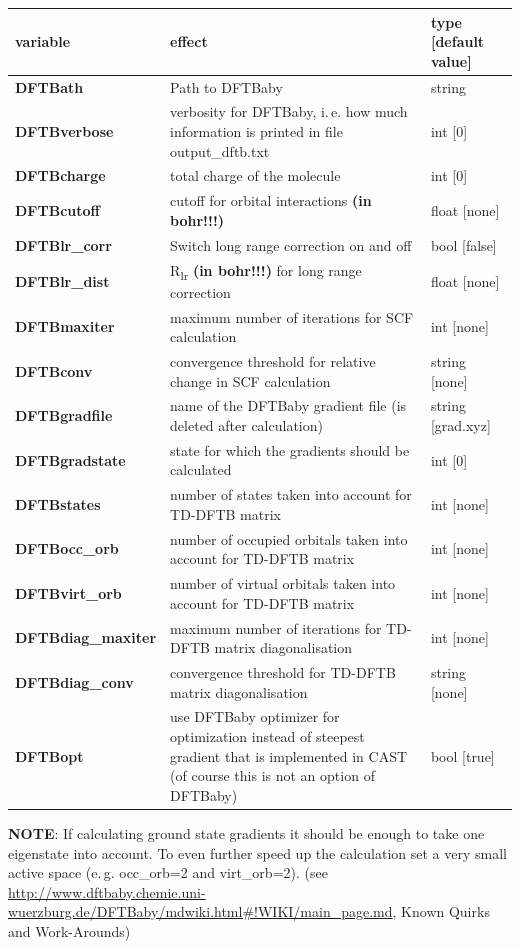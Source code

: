 \documentclass[10pt,a4paper]{article} %
\begin{document}
\begin{longtable}{|p{3.5cm}|p{5cm}|p{3cm}|}
	variable & effect & type [default value] \\
	\hline
	\textbf{DFTBath} & Path to DFTBaby & string \\
	\textbf{DFTBverbose} & verbosity for DFTBaby, i.\,e. how much information is printed in file output\_dftb.txt & int [0] \\	
	\textbf{DFTBcharge} & total charge of the molecule & int [0] \\
	\textbf{DFTBcutoff} & cutoff for orbital interactions \textbf{(in bohr!!!)} & float [none] \\
	\textbf{DFTBlr\_corr} & Switch long range correction on and off & bool [false] \\
	\textbf{DFTBlr\_dist} & R\textsubscript{lr} \textbf{(in bohr!!!)} for long range correction & float [none] \\
	\textbf{DFTBmaxiter} & maximum number of iterations for SCF calculation & int [none] \\
	\textbf{DFTBconv} & convergence threshold for relative change in SCF calculation & string [none] \\
	\textbf{DFTBgradfile} & name of the DFTBaby gradient file (is deleted after calculation) & string [grad.xyz] \\
	\textbf{DFTBgradstate} & state for which the gradients should be calculated & int [0] \\
	\textbf{DFTBstates} & number of states taken into account for TD-DFTB matrix & int [none] \\
	\textbf{DFTBocc\_orb} & number of occupied orbitals taken into account for TD-DFTB matrix & int [none] \\
	\textbf{DFTBvirt\_orb} & number of virtual orbitals taken into account for TD-DFTB matrix & int [none] \\
	\textbf{DFTBdiag\_maxiter} & maximum number of iterations for TD-DFTB matrix diagonalisation & int [none] \\
	\textbf{DFTBdiag\_conv} & convergence threshold for TD-DFTB matrix diagonalisation & string [none] \\
	\textbf{DFTBopt} & use DFTBaby optimizer for optimization instead of steepest gradient that is implemented in CAST (of course this is not an option of DFTBaby) & bool [true] \\
\end{longtable} 

\textbf{NOTE}: If calculating ground state gradients it should be enough to take one eigenstate into account. To even further speed up the calculation set a very small active space (e.\,g. occ\_orb=2 and virt\_orb=2). (see \url{http://www.dftbaby.chemie.uni-wuerzburg.de/DFTBaby/mdwiki.html#!WIKI/main_page.md}, Known Quirks and Work-Arounds)
\end{document}
